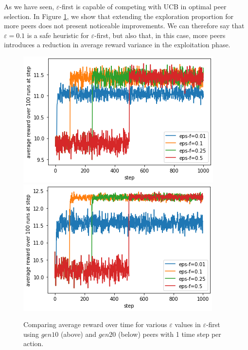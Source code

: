 \documentclass{article}
\begin{document}
As we have seen, $\varepsilon$-first is capable of competing with UCB in optimal peer selection. In Figure \ref{fig:gen10_eps-f}, we show that extending the exploration 
proportion for more peers does not present noticeable improvements. We can therefore say that $\varepsilon=0.1$ is a safe heuristic for $\varepsilon$-first, but also that, 
in this case, more peers introduces a reduction in average reward variance in the exploitation phase.
\begin{figure}[h]
    \centering
    \includegraphics[width=1\linewidth]{figs/gen10_eps-f.png}
    \includegraphics[width=1\linewidth]{figs/gen20_eps-f.png}
    \caption{Comparing average reward over time for various $\varepsilon$ values in $\varepsilon$-first using $gen10$ (above) and $gen20$ (below) peers with 1 time step per 
    action.}
    \label{fig:gen10_eps-f}
\end{figure}
\end{document}
